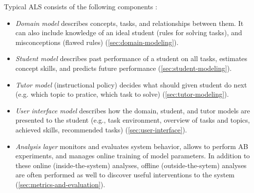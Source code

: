 Typical ALS consists of the following components
\cite{its-learner-models}:
\begin{itemize}
\item \emph{Domain model}
  describes concepts, tasks, and relationships between them.
  It can also include knowledge of an ideal student (rules for solving tasks),
  and misconceptions (flawed rules)
  (\cref{sec:domain-modeling}).
\item \emph{Student model} %
  describes past performance of a student on all tasks,
  estimates concept skills,
  and predicts future performance
  (\cref{sec:student-modeling}).
\item \emph{Tutor model}
  (instructional policy)
  decides what should given student do next
  (e.g. which topic to pratice, which task to solve)
  (\cref{sec:tutor-modeling}).
\item \emph{User interface model} %
  describes how the domain, student, and tutor models are presented to
  the student (e.g., task environment, overview of tasks and
  topics, achieved skills, recommended tasks)
  (\cref{sec:user-interface}).
\item \emph{Analysis layer}
  monitors and evaluates system behavior,
  allows to perform AB experiments,
  and manages online training of model parameters.
  In addition to these online (inside-the-system) analyses,
  offline (outside-the-sytem) analyses are often performed as well
  to discover useful interventions to the system  %
  (\cref{sec:metrics-and-evaluation}).
\end{itemize}



